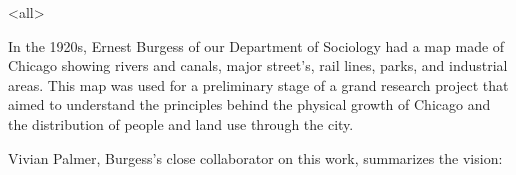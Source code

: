 \mode<all>{
}

In the 1920s, Ernest Burgess of our Department of Sociology had a map
made of Chicago showing rivers and canals, major street's, rail lines,
parks, and industrial areas. This map was used for a preliminary stage
of a grand research project that aimed to understand the principles
behind the physical growth of Chicago and the distribution of people
and land use through the city.

Vivian Palmer, Burgess's close collaborator on this work, summarizes
the vision:

